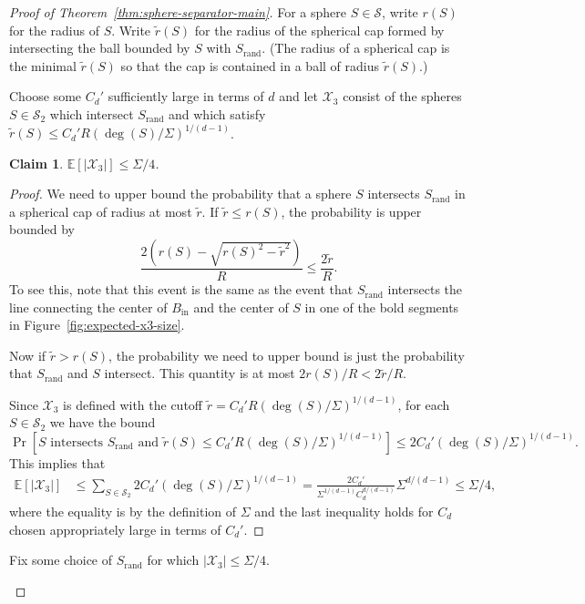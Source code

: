 \documentclass[10pt,a4paper]{amsart}
\newtheorem{claim}{Claim}
\newcommand{\E}{\mathbb E}
\newcommand{\fS}{\mathcal S}
\newcommand{\fX}{\mathcal X}
\newcommand{\paren}[1]{\left( #1 \right)}
\begin{document}
\begin{proof}[Proof of Theorem~\ref{thm:sphere-separator-main}]
For a sphere $S\in\fS$, write $r(S)$ for the radius of $S$. Write $\tilde r(S)$ for the radius of the spherical cap formed by intersecting the ball bounded by $S$ with $S_{\mathrm{rand}}$. (The radius of a spherical cap is the minimal $\tilde r(S)$ so that the cap is contained in a ball of radius $\tilde r(S)$.)

Choose some $C_d'$ sufficiently large in terms of $d$ and let $\fX_3$ consist of the spheres $S\in \fS_2$ which intersect $S_{\mathrm{rand}}$ and which satisfy $\tilde r(S)\leq C_d' R(\deg(S)/\Sigma)^{1/(d-1)}$.

\begin{claim}
\label{claim:expected-x3-size}
$\E[|\fX_3|]\leq\Sigma/4$.
\end{claim}
\begin{proof}
We need to upper bound the probability that a sphere $S$ intersects $S_{\mathrm{rand}}$ in a spherical cap of radius at most $\tilde r$. If $\tilde r\leq r(S)$, the probability is upper bounded by 
\[\frac{2\paren{r(S)-\sqrt{r(S)^2-\tilde r^2}}}R\leq \frac{2\tilde r}{R}.\]
To see this, note that this event is the same as the event that $S_{\mathrm{rand}}$ intersects the line connecting the center of $B_{\mathrm{in}}$ and the center of $S$ in one of the bold segments in Figure~\ref{fig:expected-x3-size}.

Now if $\tilde r>r(S)$, the probability we need to upper bound is just the probability that $S_{\mathrm{rand}}$ and $S$ intersect. This quantity is at most $2r(S)/R<2\tilde r/R$. 

Since $\fX_3$ is defined with the cutoff $\tilde r = C_d' R(\deg(S)/\Sigma)^{1/(d-1)}$, for each $S\in\fS_2$ we have the bound
\[\Pr\left[S\text{ intersects }S_{\mathrm{rand}}\text{ and }\tilde r(S)\leq C_d' R(\deg(S)/\Sigma)^{1/(d-1)}\right]\leq 2C_d'(\deg(S)/\Sigma)^{1/(d-1)}.\]
This implies that
\begin{align*}
\E[|\fX_3|]
&\leq \sum_{S\in\fS_2} 2C_d'(\deg(S)/\Sigma)^{1/(d-1)}
=\frac{2C_d'}{\Sigma^{1/(d-1)}C_d^{d/(d-1)}}\Sigma^{d/(d-1)}
\leq \Sigma/4,
\end{align*}
where the equality is by the definition of $\Sigma$ and the last inequality holds for $C_d$ chosen appropriately large in terms of $C_d'$.
\end{proof}

Fix some choice of $S_{\mathrm{rand}}$ for which $|\fX_3|\leq\Sigma/4$. 

\begin{figure}
\centering
{}
\end{figure}
\end{proof}
\end{document}
